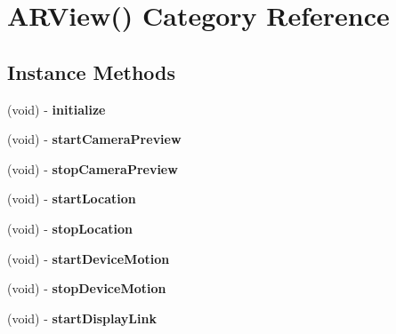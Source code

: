 \hypertarget{category_a_r_view_07_08}{\section{A\-R\-View() Category Reference}
\label{category_a_r_view_07_08}
}
\subsection*{Instance Methods}
\begin{DoxyCompactItemize}
\item 
\hypertarget{category_a_r_view_07_08_a25a40b6614565f755233080a384c35f1}{(void) -\/ {\bfseries initialize}}\label{category_a_r_view_07_08_a25a40b6614565f755233080a384c35f1}

\item 
\hypertarget{category_a_r_view_07_08_a692f27420f0047f44f1e2ed5de6e7acb}{(void) -\/ {\bfseries start\-Camera\-Preview}}\label{category_a_r_view_07_08_a692f27420f0047f44f1e2ed5de6e7acb}

\item 
\hypertarget{category_a_r_view_07_08_a9b6bf385590ce4bb1a5b0de8f203f6ed}{(void) -\/ {\bfseries stop\-Camera\-Preview}}\label{category_a_r_view_07_08_a9b6bf385590ce4bb1a5b0de8f203f6ed}

\item 
\hypertarget{category_a_r_view_07_08_a62db156640a0af8df84d49f51f043895}{(void) -\/ {\bfseries start\-Location}}\label{category_a_r_view_07_08_a62db156640a0af8df84d49f51f043895}

\item 
\hypertarget{category_a_r_view_07_08_aef73aa144c7aad72f9ae1e362cbdf8cc}{(void) -\/ {\bfseries stop\-Location}}\label{category_a_r_view_07_08_aef73aa144c7aad72f9ae1e362cbdf8cc}

\item 
\hypertarget{category_a_r_view_07_08_abe0919203c9809592932c1a260e8f39f}{(void) -\/ {\bfseries start\-Device\-Motion}}\label{category_a_r_view_07_08_abe0919203c9809592932c1a260e8f39f}

\item 
\hypertarget{category_a_r_view_07_08_a5400aa172c1964d34cd274c261fc9c95}{(void) -\/ {\bfseries stop\-Device\-Motion}}\label{category_a_r_view_07_08_a5400aa172c1964d34cd274c261fc9c95}

\item 
\hypertarget{category_a_r_view_07_08_a24cecc5cdce06b8617dadcf8e59f7efc}{(void) -\/ {\bfseries start\-Display\-Link}}\label{category_a_r_view_07_08_a24cecc5cdce06b8617dadcf8e59f7efc}


\end{DoxyCompactItemize}
